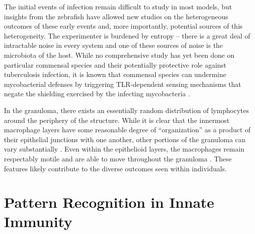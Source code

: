 The initial events of infection remain difficult to study in most models, but insights from the zebrafish have allowed new studies on the heterogeneous outcomes of these early events and, more importantly, potential sources of this heterogeneity. The experimenter is burdened by entropy -- there is a great deal of intractable noise in every system and one of these sources of noise is the microbiota of the host. While no comprehensive study has yet been done on particular commensal species and their potentially protective role against tuberculosis infection, it is known that commensal species can undermine mycobacterial defenses by triggering TLR\hyp{}dependent sensing mechanisms that negate the shielding exercised by the infecting mycobacteria \citep{Ramakrishnan2013b, Cambier2014b}.

In the granuloma, there exists an essentially random \citep{Orme2014a} distribution of lymphocytes around the periphery of the structure. While it is clear that the innermost macrophage layers have some reasonable degree of ``organization'' as a product of their epithelial junctions with one another, other portions of the granuloma can vary substantially \citep{Cronan2016}. Even within the epithelioid layers, the macrophages remain respectably motile and are able to move throughout the granuloma \citep{Cronan2018}. These features likely contribute to the diverse outcomes seen within individuals.

\section{Pattern Recognition in Innate Immunity}\label{clrs}

